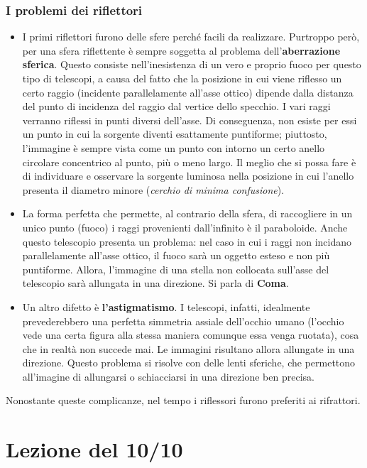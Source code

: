 \documentclass[a4paper,11pt]{article}
\begin{document}
\subsubsection{I problemi dei riflettori}
\begin{itemize}

\item I primi riflettori furono delle sfere perché facili da realizzare. Purtroppo però, per una sfera riflettente è sempre soggetta al problema dell'\textbf{aberrazione sferica}. Questo consiste nell'inesistenza di un vero e proprio fuoco per questo tipo di telescopi, a causa del fatto che la posizione in cui viene riflesso un certo raggio (incidente parallelamente all'asse ottico) dipende dalla distanza del punto di incidenza del raggio dal vertice dello specchio. I vari raggi verranno riflessi in punti diversi dell'asse. 
Di conseguenza, non esiste per essi un punto in cui la sorgente diventi esattamente puntiforme; piuttosto, l'immagine è sempre vista come un punto con intorno un certo anello circolare concentrico al punto, più o meno largo. Il meglio che si possa fare è di individuare e osservare la sorgente luminosa nella posizione in cui l'anello presenta il diametro minore (\textit{cerchio di minima confusione}).


\item La forma perfetta che permette, al contrario della sfera, di raccogliere in un unico punto (fuoco) i raggi provenienti dall'infinito è il paraboloide. Anche questo telescopio presenta un problema: nel caso in cui i raggi non incidano parallelamente all'asse ottico, il fuoco sarà un oggetto esteso e non più puntiforme. Allora, l'immagine di una stella non collocata sull'asse del telescopio sarà allungata in una direzione. Si parla di \textbf{Coma}.



\item Un altro difetto è \textbf{l'astigmatismo}. I telescopi, infatti, idealmente prevederebbero una perfetta simmetria assiale dell'occhio umano (l'occhio vede una certa figura alla stessa maniera comunque essa venga ruotata), cosa che in realtà non succede mai.  Le immagini risultano allora allungate in  una direzione. Questo problema si risolve con delle lenti sferiche, che permettono all'imagine di allungarsi o schiacciarsi in una direzione ben precisa. 
\end{itemize}
Nonostante queste complicanze, nel tempo i riflessori furono preferiti ai rifrattori.
\newpage
\section{Lezione del 10/10}
\end{document}
